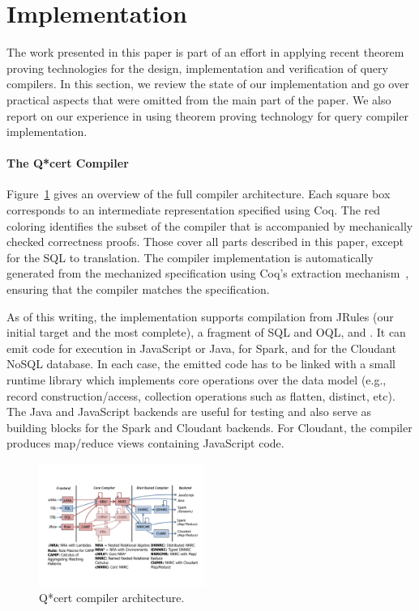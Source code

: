 \section{Implementation}
\label{section:implementation}

The work presented in this paper is part of an effort in applying
recent theorem proving technologies for the design, implementation and
verification of query compilers. In this section, we review the state
of our implementation and go over practical aspects that were omitted
from the main part of the paper. We also report on our experience in
using theorem proving technology for query compiler implementation.

\paragraph*{The Q*cert Compiler}

Figure~\ref{fig:architecture} gives an overview of the full compiler
architecture. Each square box corresponds to an intermediate
representation specified using Coq.
The red coloring identifies the
subset of the compiler that is accompanied by mechanically checked
correctness proofs. Those cover all parts described in this paper,
except for the SQL to \NRAEnv translation. The compiler
implementation is automatically generated from the mechanized
specification using Coq's extraction mechanism~\cite{coq:extraction},
ensuring that the compiler matches the specification.

As of this writing, the implementation supports compilation from
JRules (our initial target and the most complete), a fragment of SQL
and OQL, and \NRALambda. It can emit code for execution in JavaScript
or Java, for Spark, and for the Cloudant NoSQL database. In each case,
the emitted code has to be linked with a small runtime library which
implements core operations over the data model (e.g., record
construction/access, collection operations such as flatten, distinct,
etc). The Java and JavaScript backends are useful for testing and also
serve as building blocks for the Spark and Cloudant backends. For
Cloudant, the compiler produces map/reduce views containing JavaScript
code.


\begin{figure}
  \centerline{\includegraphics[width=0.48\textwidth]{qcert-pipeline.pdf}}
  \caption{\label{fig:architecture}Q*cert compiler architecture.}
\end{figure}

